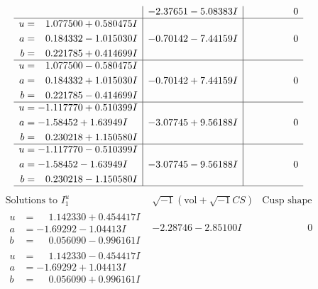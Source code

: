 \documentclass[1p]{elsarticle_modified}
\theoremstyle{definition}
\newcommand{\I}{\sqrt{-1}}
\begin{document}
$$\begin{array}{c|c|c}
 & -2.37651 - 5.08383 I & \phantom{-0.000000 } 0 \\ \hline\begin{aligned}
u &= \phantom{-}1.077500 + 0.580475 I \\
a &= \phantom{-}0.184332 - 1.015030 I \\
b &= \phantom{-}0.221785 + 0.414699 I\end{aligned}
 & -0.70142 - 7.44159 I & \phantom{-0.000000 } 0 \\ \hline\begin{aligned}
u &= \phantom{-}1.077500 - 0.580475 I \\
a &= \phantom{-}0.184332 + 1.015030 I \\
b &= \phantom{-}0.221785 - 0.414699 I\end{aligned}
 & -0.70142 + 7.44159 I & \phantom{-0.000000 } 0 \\ \hline\begin{aligned}
u &= -1.117770 + 0.510399 I \\
a &= -1.58452 + 1.63949 I \\
b &= \phantom{-}0.230218 + 1.150580 I\end{aligned}
 & -3.07745 + 9.56188 I & \phantom{-0.000000 } 0 \\ \hline\begin{aligned}
u &= -1.117770 - 0.510399 I \\
a &= -1.58452 - 1.63949 I \\
b &= \phantom{-}0.230218 - 1.150580 I\end{aligned}
 & -3.07745 - 9.56188 I & \phantom{-0.000000 } 0\\
 \hline 
 \end{array}$$\newpage$$\begin{array}{c|c|c}  
\text{Solutions to }I^u_{1}& \I (\text{vol} + \sqrt{-1}CS) & \text{Cusp shape}\\
 \hline 
\begin{aligned}
u &= \phantom{-}1.142330 + 0.454417 I \\
a &= -1.69292 - 1.04413 I \\
b &= \phantom{-}0.056090 - 0.996161 I\end{aligned}
 & -2.28746 - 2.85100 I & \phantom{-0.000000 } 0 \\ \hline\begin{aligned}
u &= \phantom{-}1.142330 - 0.454417 I \\
a &= -1.69292 + 1.04413 I \\
b &= \phantom{-}0.056090 + 0.996161 I\end{aligned}

\end{array}$$
\end{document}
